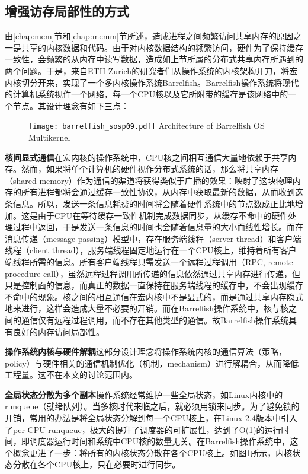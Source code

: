 \subsection{增强访存局部性的方式}
由\ref{chap:mem}节和\ref{chap:memm}节所述，造成进程之间频繁访问共享内存的原因之一是共享的内核数据和代码。由于对内核数据结构的频繁访问，硬件为了保持缓存一致性，会频繁的从内存中读写数据，造成如上节所属的分布式共享内存所遇到的两个问题。于是，来自ETH Zurich的研究者们从操作系统的内核架构开刀，将宏内核切分开来，实现了一个多内核操作系统Barrelfish\cite{barrelfish}。Barrelfish操作系统将现代的计算机系统视作一个网络，每一个CPU核以及它所附带的缓存是该网络中的一个节点。其设计理念有如下三点：

\begin{figure}[!htp]
  \centering
  \texttt{[image: barrelfish\_sosp09.pdf]}
    {Architecture of Barrelfish OS Multikernel}
  \label{fig:barrelfish}
\end{figure}

\noindent\textbf{核间显式通信}\quad 在宏内核的操作系统中，CPU核之间相互通信大量地依赖于共享内存。然而，如果将单个计算机的硬件视作分布式系统的话，那么将共享内存（shared memory）作为通信的渠道将获得类似于广播的效果：映射了这块物理内存的所有进程都将会通过缓存一致性协议，从内存中获取最新的数据，从而收到这条信息。所以，发送一条信息耗费的时间将会随着硬件系统中的节点数成正比地增加。这是由于CPU在等待缓存一致性机制完成数据同步，从缓存不命中的硬件处理过程中返回，于是发送一条信息的时间也会随着信息量的大小而线性增长。而在消息传递（message passing）模型中，存在服务端线程（server thread）和客户端线程（client thread），服务端线程固定地运行在一个CPU核上，维持着所有客户端线程所需的信息。所有客户端线程只需发送一个远程过程调用（RPC, remote procedure call），虽然远程过程调用所传递的信息依然通过共享内存进行传递，但只是控制面的信息，而真正的数据一直保持在服务端线程的缓存中，不会出现缓存不命中的现象。核之间的相互通信在宏内核中不是显式的，而是通过共享内存隐式地来进行，这样会造成大量不必要的开销。而在Barrelfish操作系统中，核与核之间的通信仅有远程过程调用，而不存在其他类型的通信。故Barrelfish操作系统具有良好的内存访问局部性。

\noindent\textbf{操作系统内核与硬件解耦}\quad 这部分设计理念将操作系统内核的通信算法（策略，policy）与硬件相关的通信机制优化（机制，mechanism）进行解耦合，从而降低工程量。这不在本文的讨论范围内。

\noindent\textbf{全局状态分散为多个副本}\quad 操作系统经常维护一些全局状态，如Linux内核中的runqueue（就绪队列）。当多核时代来临之后，就必须用锁来同步。为了避免锁的开销，常用的办法是将全局状态分解到每一个CPU核上，在Linux 2.4版本\cite{linux}中引入了per-CPU runqueue，极大的提升了调度器的可扩展性，达到了O(1)的运行时间，即调度器运行时间和系统中CPU核的数量无关。在Barrelfish操作系统中，这个概念更进了一步：将所有的内核状态分散在各个CPU核上。如图\ref{fig:barrelfish}所示，内核状态分散在各个CPU核上，只在必要时进行同步。


